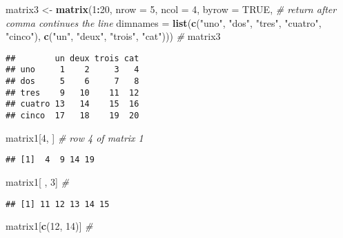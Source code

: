 \documentclass[]{article}
\newenvironment{Shaded}{\begin{snugshade}}{\end{snugshade}}
\newcommand{\KeywordTok}[1]{\textcolor[rgb]{0.13,0.29,0.53}{\textbf{#1}}}
\newcommand{\DataTypeTok}[1]{\textcolor[rgb]{0.13,0.29,0.53}{#1}}
\newcommand{\DecValTok}[1]{\textcolor[rgb]{0.00,0.00,0.81}{#1}}
\newcommand{\StringTok}[1]{\textcolor[rgb]{0.31,0.60,0.02}{#1}}
\newcommand{\CommentTok}[1]{\textcolor[rgb]{0.56,0.35,0.01}{\textit{#1}}}
\newcommand{\OtherTok}[1]{\textcolor[rgb]{0.56,0.35,0.01}{#1}}
\newcommand{\OperatorTok}[1]{\textcolor[rgb]{0.81,0.36,0.00}{\textbf{#1}}}
\newcommand{\NormalTok}[1]{#1}
\begin{document}
\begin{Shaded}
\begin{Highlighting}[]
\NormalTok{matrix3 <-}\StringTok{ }\KeywordTok{matrix}\NormalTok{(}\DecValTok{1}\OperatorTok{:}\DecValTok{20}\NormalTok{, }\DataTypeTok{nrow =} \DecValTok{5}\NormalTok{, }\DataTypeTok{ncol =} \DecValTok{4}\NormalTok{, }\DataTypeTok{byrow =} \OtherTok{TRUE}\NormalTok{, }\CommentTok{# return after comma continues the line}
                  \DataTypeTok{dimnames =} \KeywordTok{list}\NormalTok{(}\KeywordTok{c}\NormalTok{(}\StringTok{"uno"}\NormalTok{, }\StringTok{"dos"}\NormalTok{, }\StringTok{"tres"}\NormalTok{, }\StringTok{"cuatro"}\NormalTok{, }\StringTok{"cinco"}\NormalTok{), }
                                  \KeywordTok{c}\NormalTok{(}\StringTok{"un"}\NormalTok{, }\StringTok{"deux"}\NormalTok{, }\StringTok{"trois"}\NormalTok{, }\StringTok{"cat"}\NormalTok{))) }\CommentTok{#}
\NormalTok{matrix3}
\end{Highlighting}
\end{Shaded}

\begin{verbatim}
##        un deux trois cat
## uno     1    2     3   4
## dos     5    6     7   8
## tres    9   10    11  12
## cuatro 13   14    15  16
## cinco  17   18    19  20
\end{verbatim}

\begin{Shaded}
\begin{Highlighting}[]
\NormalTok{matrix1[}\DecValTok{4}\NormalTok{, ] }\CommentTok{# row 4 of matrix 1}
\end{Highlighting}
\end{Shaded}

\begin{verbatim}
## [1]  4  9 14 19
\end{verbatim}

\begin{Shaded}
\begin{Highlighting}[]
\NormalTok{matrix1[ , }\DecValTok{3}\NormalTok{] }\CommentTok{# }
\end{Highlighting}
\end{Shaded}

\begin{verbatim}
## [1] 11 12 13 14 15
\end{verbatim}

\begin{Shaded}
\begin{Highlighting}[]
\NormalTok{matrix1[}\KeywordTok{c}\NormalTok{(}\DecValTok{12}\NormalTok{, }\DecValTok{14}\NormalTok{)] }\CommentTok{#}
\end{Highlighting}
\end{Shaded}
\end{document}
